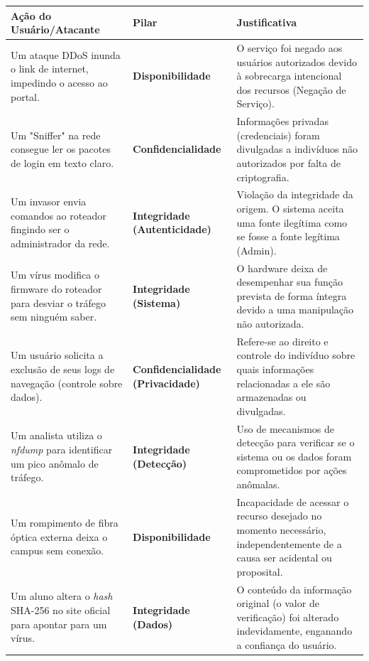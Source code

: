 \begin{table}[h!]
    \centering
    \renewcommand{\arraystretch}{1.8}
    \begin{tabular}{|p{5.5cm}|p{3cm}|p{6.5cm}|}
        \hline
        \textbf{Ação do Usuário/Atacante}                                                   & \textbf{Pilar}                           & \textbf{Justificativa}                                                                                                      \\ \hline
        Um ataque DDoS inunda o link de internet, impedindo o acesso ao portal.             & \textbf{Disponibilidade}                 & O serviço foi negado aos usuários autorizados devido à sobrecarga intencional dos recursos (Negação de Serviço).            \\ \hline
        Um "Sniffer" na rede consegue ler os pacotes de login em texto claro.               & \textbf{Confidencialidade}               & Informações privadas (credenciais) foram divulgadas a indivíduos não autorizados por falta de criptografia.                 \\ \hline
        Um invasor envia comandos ao roteador fingindo ser o administrador da rede.         & \textbf{Integridade (Autenticidade)}     & Violação da integridade da origem. O sistema aceita uma fonte ilegítima como se fosse a fonte legítima (Admin).             \\ \hline
        Um vírus modifica o firmware do roteador para desviar o tráfego sem ninguém saber.  & \textbf{Integridade (Sistema)}           & O hardware deixa de desempenhar sua função prevista de forma íntegra devido a uma manipulação não autorizada.               \\ \hline
        Um usuário solicita a exclusão de seus logs de navegação (controle sobre dados).    & \textbf{Confidencialidade (Privacidade)} & Refere-se ao direito e controle do indivíduo sobre quais informações relacionadas a ele são armazenadas ou divulgadas.      \\ \hline
        Um analista utiliza o \textit{nfdump} para identificar um pico anômalo de tráfego.  & \textbf{Integridade (Detecção)}          & Uso de mecanismos de detecção para verificar se o sistema ou os dados foram comprometidos por ações anômalas.               \\ \hline
        Um rompimento de fibra óptica externa deixa o campus sem conexão.                   & \textbf{Disponibilidade}                 & Incapacidade de acessar o recurso desejado no momento necessário, independentemente de a causa ser acidental ou proposital. \\ \hline
        Um aluno altera o \textit{hash} SHA-256 no site oficial para apontar para um vírus. & \textbf{Integridade (Dados)}             & O conteúdo da informação original (o valor de verificação) foi alterado indevidamente, enganando a confiança do usuário.    \\ \hline
    \end{tabular}
\end{table}





